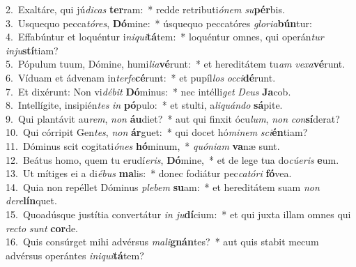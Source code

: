 {2.~}Exaltáre, qui jú\textit{di}\textit{cas} \textbf{ter}ram:~* redde retributi\textit{ó}\textit{nem} \textit{su}\textbf{pér}bis.\\
{3.~}Usquequo pecca\textit{tó}\textit{res}, \textbf{Dó}mine:~* úsquequo peccatóres \textit{glo}\textit{ri}\textit{a}\textbf{bún}tur:\\
{4.~}Effabúntur et loquéntur i\textit{ni}\textit{qui}\textbf{tá}tem:~* loquéntur omnes, qui operán\textit{tur} \textit{in}\textit{ju}\textbf{stí}tiam?\\
{5.~}Pópulum tuum, Dómine, humi\textit{li}\textit{a}\textbf{vé}runt:~* et hereditátem tu\textit{am} \textit{ve}\textit{xa}\textbf{vé}runt.\\
{6.~}Víduam et ádvenam in\textit{ter}\textit{fe}\textbf{cé}runt:~* et pupíl\textit{los} \textit{oc}\textit{ci}\textbf{dé}runt.\\
{7.~}Et dixérunt: Non vi\textit{dé}\textit{bit} \textbf{Dó}minus:~* nec intélli\textit{get} \textit{De}\textit{us} \textbf{Ja}cob.\\
{8.~}Intellígite, insipién\textit{tes} \textit{in} \textbf{pó}pulo:~* et stulti, a\textit{li}\textit{quán}\textit{do} \textbf{sá}pite.\\
{9.~}Qui plantávit au\textit{rem}, \textit{non} \textbf{áu}diet?~* aut qui finxit ócu\textit{lum}, \textit{non} \textit{con}\textbf{sí}derat?\\
{10.~}Qui córripit Gen\textit{tes}, \textit{non} \textbf{ár}guet:~* qui docet hó\textit{mi}\textit{nem} \textit{sci}\textbf{én}tiam?\\
{11.~}Dóminus scit cogitati\textit{ó}\textit{nes} \textbf{hó}minum,~* \textit{quó}\textit{ni}\textit{am} \textbf{va}næ sunt.\\
{12.~}Beátus homo, quem tu erudí\textit{e}\textit{ris}, \textbf{Dó}mine,~* et de lege tua do\textit{cú}\textit{e}\textit{ris} \textbf{e}um.\\
{13.~}Ut mítiges ei a di\textit{é}\textit{bus} \textbf{ma}lis:~* donec fodiátur pec\textit{ca}\textit{tó}\textit{ri} \textbf{fó}vea.\\
{14.~}Quia non repéllet Dóminus \textit{ple}\textit{bem} \textbf{su}am:~* et hereditátem suam \textit{non} \textit{de}\textit{re}\textbf{lín}quet.\\
{15.~}Quoadúsque justítia convertátur \textit{in} \textit{ju}\textbf{dí}cium:~* et qui juxta illam omnes qui \textit{re}\textit{cto} \textit{sunt} \textbf{cor}de.\\
{16.~}Quis consúrget mihi advérsus \textit{ma}\textit{li}\textbf{gnán}tes?~* aut quis stabit mecum advérsus operántes \textit{i}\textit{ni}\textit{qui}\textbf{tá}tem?\\
